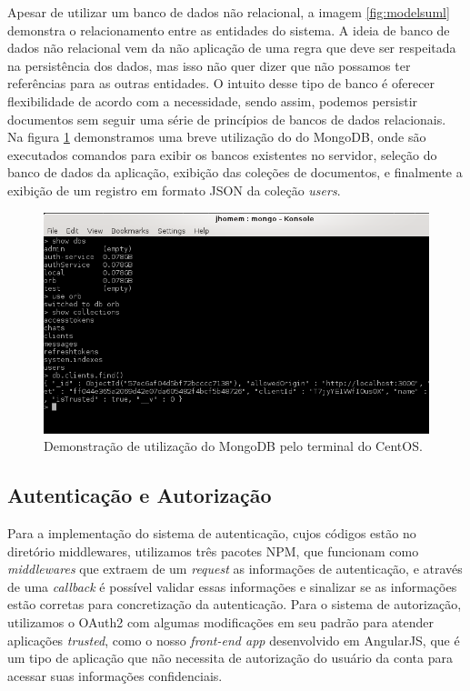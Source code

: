 Apesar de utilizar um banco de dados não relacional, a imagem \ref{fig:modelsuml} demonstra o relacionamento entre as entidades do sistema. A ideia de banco de dados não relacional vem da não aplicação de uma regra que deve ser respeitada na persistência dos dados, mas isso não quer dizer que não possamos ter referências para as outras entidades. O intuito desse tipo de banco é oferecer flexibilidade de acordo com a necessidade, sendo assim, podemos persistir documentos sem seguir uma série de princípios de bancos de dados relacionais. Na figura \ref{fig:mongoconsole} demonstramos uma breve utilização do do MongoDB, onde são executados comandos para exibir os bancos existentes no servidor, seleção do banco de dados da aplicação, exibição das coleções de documentos, e finalmente a exibição de um registro em formato JSON da coleção \textit{users}.  

\begin{figure}[!h]
	\centering
	\includegraphics[scale=0.75]{imagens/mongo_console.png}
	\caption{\small Demonstração de utilização do MongoDB pelo terminal do CentOS.}
	\label{fig:mongoconsole}
\end{figure}


\subsection{Autenticação e Autorização}
Para a implementação do sistema de autenticação, cujos códigos estão no diretório middlewares, utilizamos três pacotes NPM, que funcionam como \textit{middlewares} que extraem de um \textit{request} as informações de autenticação, e através de uma \textit{callback} é possível validar essas informações e sinalizar se as informações estão corretas para concretização da autenticação. Para o sistema de autorização, utilizamos o OAuth2 com algumas modificações em seu padrão para atender aplicações \textit{trusted}, como o nosso \textit{front-end app} desenvolvido em AngularJS, que é um tipo de aplicação que não necessita de autorização do usuário da conta para acessar suas informações confidenciais.

